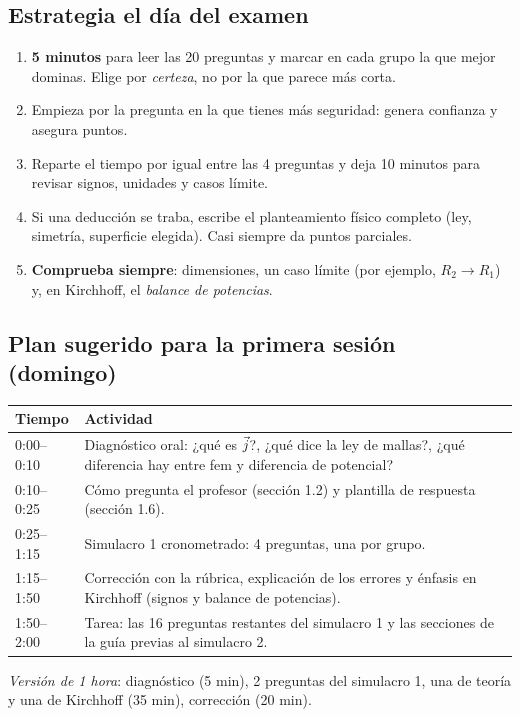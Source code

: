 \documentclass[11pt]{article}
\begin{document}
\subsection{Estrategia el día del examen}
\begin{enumerate}
\item \textbf{5 minutos} para leer las 20 preguntas y marcar en cada grupo la que mejor dominas. Elige por \emph{certeza}, no por la que parece más corta.
\item Empieza por la pregunta en la que tienes más seguridad: genera confianza y asegura puntos.
\item Reparte el tiempo por igual entre las 4 preguntas y deja 10 minutos para revisar signos, unidades y casos límite.
\item Si una deducción se traba, escribe el planteamiento físico completo (ley, simetría, superficie elegida). Casi siempre da puntos parciales.
\item \textbf{Comprueba siempre}: dimensiones, un caso límite (por ejemplo, $R_2\to R_1$) y, en Kirchhoff, el \emph{balance de potencias}.
\end{enumerate}

\subsection{Plan sugerido para la primera sesión (domingo)}
\begin{center}
\small
\begin{tabularx}{\linewidth}{@{}p{2.2cm}X@{}}
\toprule
\textbf{Tiempo} & \textbf{Actividad}\\
\midrule
0:00--0:10 & Diagnóstico oral: ¿qué es $\vec{j}$?, ¿qué dice la ley de mallas?, ¿qué diferencia hay entre fem y diferencia de potencial?\\
0:10--0:25 & Cómo pregunta el profesor (sección 1.2) y plantilla de respuesta (sección 1.6).\\
0:25--1:15 & Simulacro 1 cronometrado: 4 preguntas, una por grupo.\\
1:15--1:50 & Corrección con la rúbrica, explicación de los errores y énfasis en Kirchhoff (signos y balance de potencias).\\
1:50--2:00 & Tarea: las 16 preguntas restantes del simulacro 1 y las secciones de la guía previas al simulacro 2.\\
\bottomrule
\end{tabularx}
\end{center}
\emph{Versión de 1 hora}: diagnóstico (5 min), 2 preguntas del simulacro 1, una de teoría y una de Kirchhoff (35 min), corrección (20 min).
\end{document}
